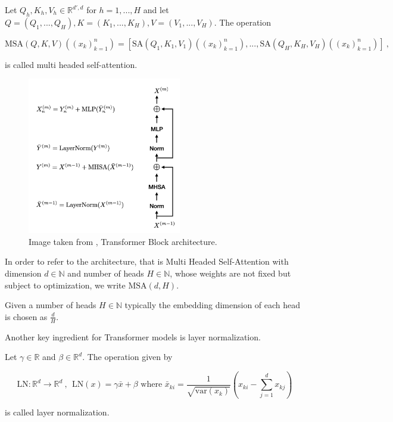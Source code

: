 \begin{definition}
    \label{def:msa}
    Let $Q_h, K_h, V_h \in \mathbb R^{d', d}$ for $h= 1,..., H$ and let $Q = (Q_1, ..., Q_H), K = (K_1, ..., K_H), V = (V_1, ..., V_H)$.
    The operation

        $$ \text{MSA}(Q, K, V) \left((x_{k})_{k=1}^n \right) = [\text{SA}(Q_1, K_1, V_1)\left((x_{k})_{k=1}^n \right), ..., \text{SA}(Q_H, K_H, V_H)\left((x_{k})_{k=1}^n \right)] ~, $$

    is called multi headed self-attention.
\end{definition}

\begin{figure}[h!]
    \includegraphics[width=0.6\textwidth]{models/preliminaries/imgs/transformer-block.png}
    \caption{Image taken from \cite{turnerIntroductionTransformers2024}, Transformer Block architecture.}
    \label{fig:transformer_block}
\end{figure}

\noindent In order to refer to the architecture,
that is Multi Headed Self-Attention with dimension $d \in \mathbb N$ and number of heads $H \in \mathbb N$,
whose weights are not fixed but subject to optimization, 
we write $\text{MSA}(d, H)$.

\noindent Given a number of heads $H \in \mathbb N$ typically the embedding dimension of each head is chosen as $\frac{d}{H}$.

\noindent Another key ingredient for Transformer models is layer normalization.

\begin{definition}
    Let $\gamma \in \mathbb R$ and $\beta \in \mathbb R^d$. The operation given by

        $$\text{LN} : \mathbb R^d \to \mathbb R^d ~, ~~ 
        \text{LN}(x) = \gamma \bar{x} + \beta 
        \text{ where } \bar{x}_{ki} = \frac{1}{\sqrt{\text{var}(x_{k})}} (x_{ki} - \sum_{j=1}^d x_{kj})$$

    is called layer normalization.
\end{definition}

